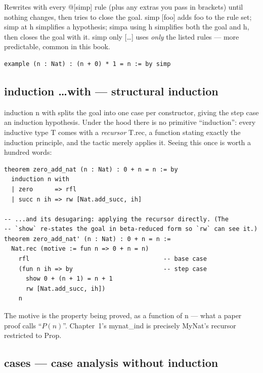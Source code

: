 \documentclass[12pt, openany]{book}
\theoremstyle{plain}
\theoremstyle{definition}
\theoremstyle{remark}
\newcommand{\li}[1]{{\ttfamily\small\color{tealaccent}#1}}
\begin{document}
Rewrites with every \li{@[simp]} rule (plus any extras you pass in brackets) until nothing changes, then tries to close the goal.  \li{simp [foo]} adds \li{foo} to the rule set; \li{simp at h} simplifies a hypothesis; \li{simpa using h} simplifies both the goal and \li{h}, then closes the goal with it.  \li{simp only [\ldots]} uses \emph{only} the listed rules --- more predictable, common in this book.

\begin{leanbox}
\begin{lstlisting}
example (n : Nat) : (n + 0) * 1 = n := by simp
\end{lstlisting}
\end{leanbox}
\color{black}

\subsection*{\li{induction \ldots with} --- structural induction}\label{sec:primer-induction}

\li{induction n with} splits the goal into one case per constructor, giving the step case an induction hypothesis.  Under the hood there is no primitive ``induction'': every \li{inductive} type \li{T} comes with a \emph{recursor} \li{T.rec}, a function stating exactly the induction principle, and the tactic merely applies it.  Seeing this once is worth a hundred words:

\begin{leanbox}
\begin{lstlisting}
theorem zero_add_nat (n : Nat) : 0 + n = n := by
  induction n with
  | zero      => rfl
  | succ n ih => rw [Nat.add_succ, ih]

-- ...and its desugaring: applying the recursor directly. (The
-- `show` re-states the goal in beta-reduced form so `rw` can see it.)
theorem zero_add_nat' (n : Nat) : 0 + n = n :=
  Nat.rec (motive := fun n => 0 + n = n)
    rfl                                     -- base case
    (fun n ih => by                         -- step case
      show 0 + (n + 1) = n + 1
      rw [Nat.add_succ, ih])
    n
\end{lstlisting}
\end{leanbox}
\color{black}

The \li{motive} is the property being proved, as a function of \li{n} --- what a paper proof calls ``$P(n)$''.  Chapter~1's \li{mynat\_ind} is precisely \li{MyNat}'s recursor restricted to \li{Prop}.

\subsection*{\li{cases} --- case analysis without induction}
\end{document}
